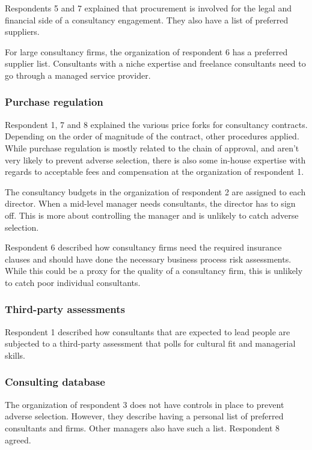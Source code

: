 \documentclass[
  man,floatsintext]{apa6}
\begin{document}
Respondents 5 and 7 explained that procurement is involved for the legal and financial side of a consultancy engagement. They also have a list of preferred suppliers.

For large consultancy firms, the organization of respondent 6 has a preferred supplier list. Consultants with a niche expertise and freelance consultants need to go through a managed service provider.

\subsubsection{Purchase regulation}\label{purchase-regulation}

Respondent 1, 7 and 8 explained the various price forks for consultancy contracts. Depending on the order of magnitude of the contract, other procedures applied. While purchase regulation is mostly related to the chain of approval, and aren't very likely to prevent adverse selection, there is also some in-house expertise with regards to acceptable fees and compensation at the organization of respondent 1.

The consultancy budgets in the organization of respondent 2 are assigned to each director. When a mid-level manager needs consultants, the director has to sign off. This is more about controlling the manager and is unlikely to catch adverse selection.

Respondent 6 described how consultancy firms need the required insurance clauses and should have done the necessary business process risk assessments. While this could be a proxy for the quality of a consultancy firm, this is unlikely to catch poor individual consultants.

\subsubsection{Third-party assessments}\label{third-party-assessments-1}

Respondent 1 described how consultants that are expected to lead people are subjected to a third-party assessment that polls for cultural fit and managerial skills.

\subsubsection{Consulting database}\label{consulting-database-1}

The organization of respondent 3 does not have controls in place to prevent adverse selection. However, they describe having a personal list of preferred consultants and firms. Other managers also have such a list. Respondent 8 agreed.
\end{document}
